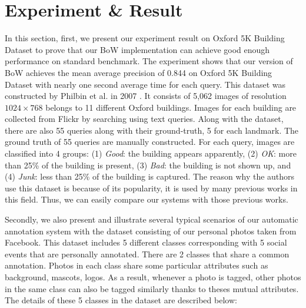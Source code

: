 \section{Experiment \& Result} \label{section:experiment_result}

In this section, first, we present our experiment result on Oxford 5K Building Dataset to prove that our BoW implementation can achieve good enough performance on standard benchmark. The experiment shows that our version of BoW achieves the mean average precision of 0.844 on Oxford 5K Building Dataset with nearly one second average time for each query. This dataset was constructed by Philbin et al. in 2007 \cite{2}. It consists of 5,062 images of resolution $1024 \times 768$ belongs to 11 different Oxford buildings. Images for each building are collected from Flickr by searching using text queries. Along with the dataset, there are also 55 queries along with their ground-truth, 5 for each landmark. The ground truth of 55 queries are manually constructed. For each query, images are classified into 4 groups: (1) \textit{Good}: the building appears apparently, (2) \textit{OK}: more than 25\% of the building is present, (3) \textit{Bad}: the building is not shown up, and (4) \textit{Junk}: less than 25\% of the building is captured. The reason why the authors use this dataset is because of its popularity, it is used by many previous works in this field. Thus, we can easily compare our systems with those previous works.

Secondly, we also present and illustrate several typical scenarios of our automatic annotation system with the dataset consisting of our personal photos taken from Facebook. This dataset includes 5 different classes corresponding with 5 social events that are personally annotated. There are 2 classes that share a common annotation. Photos in each class share some particular attributes such as background, mascots, logos. As a result, whenever a photo is tagged, other photos in the same class can also be tagged similarly thanks to theses mutual attributes. The details of these 5 classes in the dataset are described below:

